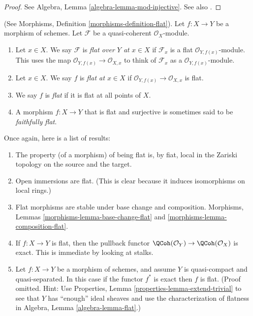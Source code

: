 \begin{proof}
See Algebra, Lemma \ref{algebra-lemma-mod-injective}.
See also \cite[Section 20]{MatCA}.
\end{proof}

\begin{definition}
\label{definition-flat-schemes}
(See Morphisms, Definition \ref{morphisms-definition-flat}).
Let $f : X \to Y$ be a morphism of schemes.
Let $\mathcal{F}$ be a quasi-coherent $\mathcal{O}_X$-module.
\begin{enumerate}
\item Let $x \in X$. We say $\mathcal{F}$ is
{\it flat over $Y$ at $x \in X$} if $\mathcal{F}_x$
is a flat $\mathcal{O}_{Y, f(x)}$-module.
This uses the map $\mathcal{O}_{Y, f(x)} \to \mathcal{O}_{X, x}$ to
think of $\mathcal{F}_x$ as a $\mathcal{O}_{Y, f(x)}$-module.
\item Let $x \in X$. We say $f$ is {\it flat at $x \in X$}
if $\mathcal{O}_{Y, f(x)} \to \mathcal{O}_{X, x}$ is flat.
\item We say $f$ is {\it flat} if it is flat at all points of $X$.
\item A morphism $f : X \to Y$ that is flat and surjective is sometimes
said to be {\it faithfully flat}.
\end{enumerate}
\end{definition}

\noindent
Once again, here is a list of results:
\begin{enumerate}
\item The property (of a morphism) of being flat is, by fiat,
local in the Zariski topology on the source and the target.
\item Open immersions are flat. (This is clear because it induces isomorphisms
on local rings.)
\item Flat morphisms are stable under base change and composition.
Morphisms, Lemmas \ref{morphisms-lemma-base-change-flat} and
\ref{morphisms-lemma-composition-flat}.
\item If $f : X \to Y$ is flat, then the pullback functor
$\QCoh(\mathcal{O}_Y) \to \QCoh(\mathcal{O}_X)$ is exact.
This is immediate by looking at stalks.
\item Let $f : X \to Y$ be a morphism of schemes, and assume $Y$
is quasi-compact and quasi-separated. In this case
if the functor $f^*$ is exact then $f$ is flat.
(Proof omitted. Hint: Use
Properties, Lemma \ref{properties-lemma-extend-trivial} to see that
$Y$ has ``enough'' ideal sheaves and use the characterization of
flatness in Algebra, Lemma \ref{algebra-lemma-flat}.)
\end{enumerate}



